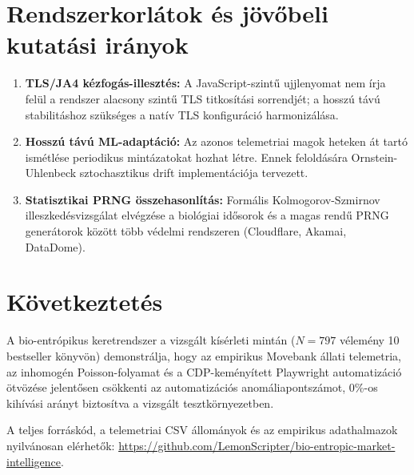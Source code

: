 \documentclass[11pt,a4paper]{article}
\begin{document}
\section{Rendszerkorlátok és jövőbeli kutatási irányok}

\begin{enumerate}
    \item \textbf{TLS/JA4 kézfogás-illesztés:} A JavaScript-szintű ujjlenyomat nem írja felül a rendszer alacsony szintű TLS titkosítási sorrendjét; a hosszú távú stabilitáshoz szükséges a natív TLS konfiguráció harmonizálása.
    \item \textbf{Hosszú távú ML-adaptáció:} Az azonos telemetriai magok heteken át tartó ismétlése periodikus mintázatokat hozhat létre. Ennek feloldására Ornstein-Uhlenbeck sztochasztikus drift implementációja tervezett.
    \item \textbf{Statisztikai PRNG összehasonlítás:} Formális Kolmogorov-Szmirnov illeszkedésvizsgálat elvégzése a biológiai idősorok és a magas rendű PRNG generátorok között több védelmi rendszeren (Cloudflare, Akamai, DataDome).
\end{enumerate}

\section{Következtetés}

A bio-entrópikus keretrendszer a vizsgált kísérleti mintán ($N=797$ vélemény 10 bestseller könyvön) demonstrálja, hogy az empirikus Movebank állati telemetria, az inhomogén Poisson-folyamat és a CDP-keményített Playwright automatizáció ötvözése jelentősen csökkenti az automatizációs anomáliapontszámot, 0\%-os kihívási arányt biztosítva a vizsgált tesztkörnyezetben.

\noindent A teljes forráskód, a telemetriai CSV állományok és az empirikus adathalmazok nyilvánosan elérhetők:  
\url{https://github.com/LemonScripter/bio-entropic-market-intelligence}.
\end{document}
